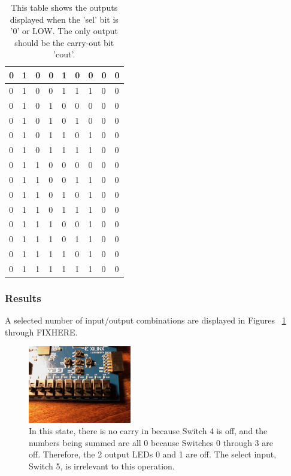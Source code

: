 \documentclass[11pt]{article}
\begin{document}
\begin{table}[H]
\begin{center}
\begin{tabular}{| l | l | l | l | l | l | l | l | l |}
		0 & 1 & 0 & 0 & 1 & 0 & 0 & 0 & 0 \\ \hline
		0 & 1 & 0 & 0 & 1 & 1 & 1 & 0 & 0 \\ \hline
		0 & 1 & 0 & 1 & 0 & 0 & 0 & 0 & 0 \\ \hline
		0 & 1 & 0 & 1 & 0 & 1 & 0 & 0 & 0 \\ \hline
		0 & 1 & 0 & 1 & 1 & 0 & 1 & 0 & 0 \\ \hline
		0 & 1 & 0 & 1 & 1 & 1 & 1 & 0 & 0 \\ \hline
		0 & 1 & 1 & 0 & 0 & 0 & 0 & 0 & 0 \\ \hline
		0 & 1 & 1 & 0 & 0 & 1 & 1 & 0 & 0 \\ \hline
		0 & 1 & 1 & 0 & 1 & 0 & 1 & 0 & 0 \\ \hline
		0 & 1 & 1 & 0 & 1 & 1 & 1 & 0 & 0 \\ \hline
		0 & 1 & 1 & 1 & 0 & 0 & 1 & 0 & 0 \\ \hline
		0 & 1 & 1 & 1 & 0 & 1 & 1 & 0 & 0 \\ \hline
		0 & 1 & 1 & 1 & 1 & 0 & 1 & 0 & 0 \\ \hline
		0 & 1 & 1 & 1 & 1 & 1 & 1 & 0 & 0 \\ \hline
	\end{tabular}
	\caption{\label{tab:selZeroTruthTable}This table shows the outputs displayed when the 'sel' bit is '0' or LOW. The only output should be the carry-out bit 'cout'.}
\end{center}
\end{table}

\subsubsection{Results}
A selected number of input/output combinations are displayed in Figures ~\ref{fig:BitMuxAllOff} through FIXHERE.

\begin{figure}[H]
\begin{center}
	\includegraphics[width=0.4\textwidth]{./report-images/Part2/IMG_0468.jpg}
	\caption{\label{fig:BitMuxAllOff}In this state, there is no carry in because Switch 4 is off, and the numbers being summed are all 0 because Switches 0 through 3 are off. Therefore, the 2 output LEDs 0 and 1 are off. The select input, Switch 5, is irrelevant to this operation.}
\end{center}
\end{figure}
\end{document}
